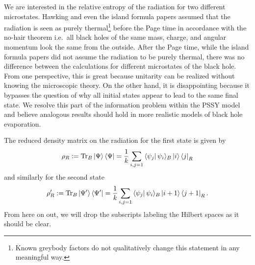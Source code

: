 \documentclass[a4paper,11pt]{article}
\newcommand{\Tr}{\text{Tr}}
\begin{document}
We are interested in the relative entropy of the radiation for two different microstates. Hawking and even the island formula papers assumed that the radiation is seen as purely thermal\footnote{Known greybody factors do not qualitatively change this statement in any meaningful way.} before the Page time in accordance with the no-hair theorem i.e.~all black holes of the same mass, charge, and angular momentum look the same from the outside. After the Page time, while the island formula papers did not assume the radiation to be purely thermal, there was no difference between the calculations for different microstates of the black hole. From one perspective, this is great because unitarity can be realized without knowing the microscopic theory. On the other hand, it is disappointing because it bypasses the question of why all initial states appear to lead to the same final state. We resolve this part of the information problem within the PSSY model and believe analogous results should hold in more realistic models of black hole evaporation.

The reduced density matrix on the radiation for the first state is given by
\begin{align}
    \rho_R := \Tr_B \ket{\Psi} \bra{\Psi} = \frac{1}{k}\sum_{i,j = 1} \bra{\psi_j}\psi_i\rangle_B \ket{i}\bra{j}_R
    \label{PSSYrho1}
\end{align}
and similarly for the second state 
\begin{align}
    \rho_R' := \Tr_B \ket{\Psi'} \bra{\Psi'} = \frac{1}{k}\sum_{i,j = 1} \bra{\psi_j}\psi_i\rangle_B \ket{i+1}\bra{j+1}_R.
    \label{PSSYrho2}
\end{align}
From here on out, we will drop the subscripts labeling the Hilbert spaces as it should be clear.
\end{document}
